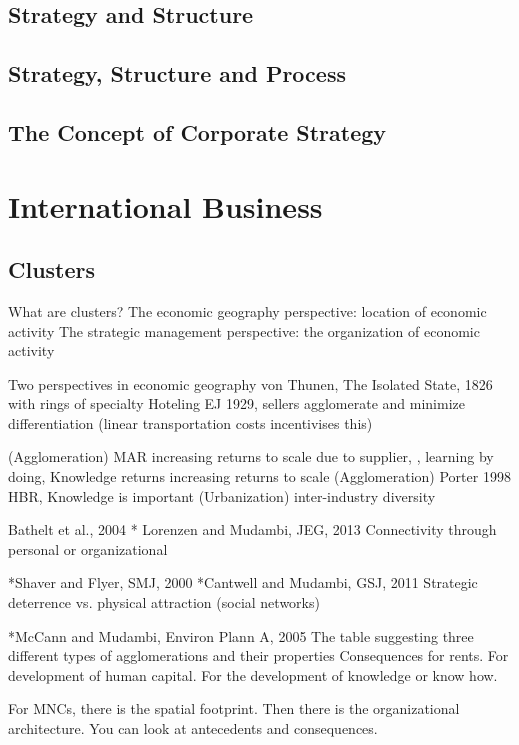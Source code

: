\documentclass[12pt,letterpaper]{article}
\begin{document}
\subsection{Strategy and Structure}
\subsection{Strategy, Structure and Process}
\subsection{The Concept of Corporate Strategy}

\newpage

\section{International Business}

\subsection{Clusters}
What are clusters?
The economic geography perspective: location of economic activity 
The strategic management perspective: the organization of economic activity

Two perspectives in economic geography
von Thunen, The Isolated State, 1826 with rings of specialty
Hoteling EJ 1929, sellers agglomerate and minimize differentiation (linear transportation costs incentivises this)

(Agglomeration) MAR \cite{Marshall1890} increasing returns to scale due to supplier, \cite{Arrow1962}, learning by doing, \cite{Romer1986} Knowledge returns increasing returns to scale
(Agglomeration) Porter 1998 HBR, Knowledge is important
(Urbanization) \cite{Jacobs1969} inter-industry diversity

Bathelt et al., 2004
* Lorenzen and Mudambi, JEG, 2013
Connectivity through personal or organizational

*Shaver and Flyer, SMJ, 2000
*Cantwell and Mudambi, GSJ, 2011
Strategic deterrence vs. physical attraction (social networks)

*McCann and Mudambi, Environ Plann A,  2005
The table suggesting three different types of agglomerations and their properties
Consequences for rents. For development of human capital. For the development of knowledge or know how.

For MNCs, there is the spatial footprint. Then there is the organizational architecture. You can look at antecedents and consequences.
\end{document}
